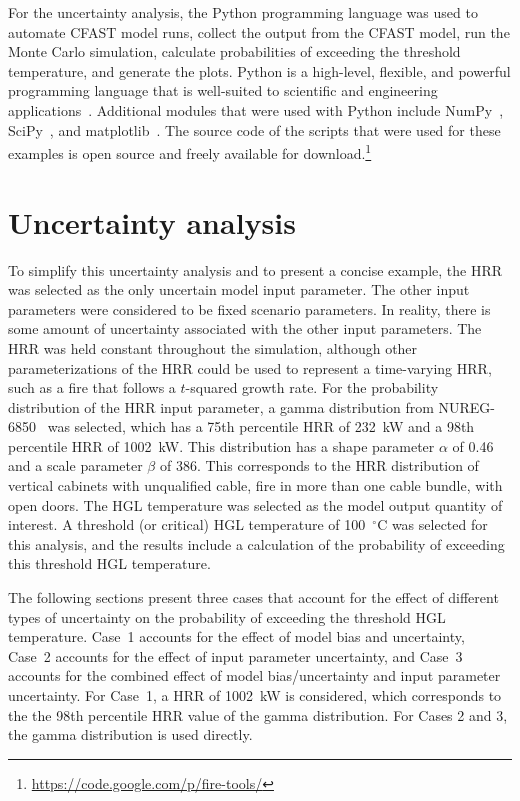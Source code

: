 \documentclass[12pt]{article}
\begin{document}
For the uncertainty analysis, the Python programming language was used to automate CFAST model runs, collect the output from the CFAST model, run the Monte Carlo simulation, calculate probabilities of exceeding the threshold temperature, and generate the plots. Python is a high-level, flexible, and powerful programming language that is well-suited to scientific and engineering applications~\cite{Oliphant:2007}. Additional modules that were used with Python include NumPy~\cite{oliphant2006guide}, SciPy~\cite{Jones:2001fk}, and matplotlib~\cite{Hunter:2007}. The source code of the scripts that were used for these examples is open source and freely available for download.\footnote{\url{https://code.google.com/p/fire-tools/}}


\section{Uncertainty analysis}
\label{sec:uncertainty_analysis}

 To simplify this uncertainty analysis and to present a concise example, the HRR was selected as the only uncertain model input parameter. The other input parameters were considered to be fixed scenario parameters. In reality, there is some amount of uncertainty associated with the other input parameters. The HRR was held constant throughout the simulation, although other parameterizations of the HRR could be used to represent a time-varying HRR, such as a fire that follows a $t$-squared growth rate. For the probability distribution of the HRR input parameter, a gamma distribution from NUREG-6850~\cite{NUREG_6850} was selected, which has a 75th percentile HRR of 232~kW and a 98th percentile HRR of 1002~kW. This distribution has a shape parameter $\alpha$ of 0.46 and a scale parameter $\beta$ of 386. This corresponds to the HRR distribution of vertical cabinets with unqualified cable, fire in more than one cable bundle, with open doors. The HGL temperature was selected as the model output quantity of interest. A threshold (or critical) HGL temperature of 100~$^\circ$C was selected for this analysis, and the results include a calculation of the probability of exceeding this threshold HGL temperature.

The following sections present three cases that account for the effect of different types of uncertainty on the probability of exceeding the threshold HGL temperature. Case~1 accounts for the effect of model bias and uncertainty, Case~2 accounts for the effect of input parameter uncertainty, and Case~3 accounts for the combined effect of model bias/uncertainty and input parameter uncertainty. For Case~1, a HRR of 1002~kW is considered, which corresponds to the the 98th percentile HRR value of the gamma distribution. For Cases 2 and 3, the gamma distribution is used directly.
\end{document}
